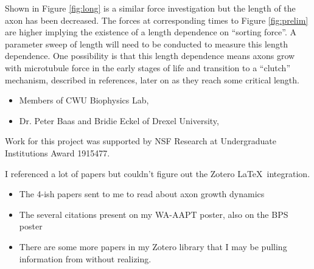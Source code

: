 \documentclass[]{biophysicist}
\begin{document}
Shown in Figure \ref{fig:long} is a similar force investigation but the length of the axon has been decreased. The forces at corresponding times to Figure \ref{fig:prelim} are higher implying the existence of a length dependence on ``sorting force''. A parameter sweep of length will need to be conducted to measure this length dependence. One possibility is that this length dependence means axons grow with microtubule force in the early stages of life and transition to a ``clutch'' mechanism, described in references, later on as they reach some critical length.

\begin{itemize}
\item Members of CWU Biophysics Lab,
\item Dr. Peter Baas and Bridie Eckel of Drexel University,
\end{itemize}
Work for this project was supported by NSF Research at Undergraduate Institutions Award 1915477.

I referenced a lot of papers but couldn't figure out the Zotero \LaTeX\ integration.
\begin{itemize}
\item The 4-ish papers sent to me to read about axon growth dynamics
\item The several citations present on my WA-AAPT poster, also on the BPS poster
\item There are some more papers in my Zotero library that I may be pulling information from without realizing.
\end{itemize}
\end{document}
